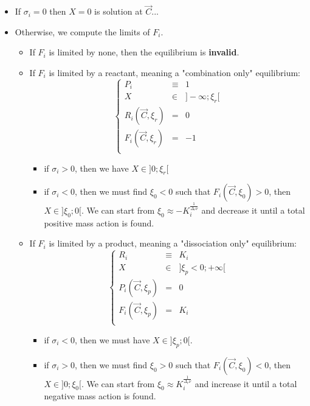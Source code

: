 \documentclass[aps,12pt]{revtex4}
\begin{document}
\begin{itemize}

\item If $\sigma_i=0$ then $X=0$ is solution at $\vec{C}$...

\item Otherwise, we compute the limits of $F_i$.
	
	\begin{itemize}
	\item If $F_i$ is limited by none, then the equilibrium is \textbf{invalid}.

	\item If $F_i$ is limited by a reactant, meaning a "combination only" equilibrium:
		\begin{equation}
		\left\lbrace
			\begin{array}{rcl}
			P_i   & \equiv & 1\\
			X     & \in & \rbrack-\infty;\xi_r\lbrack\\
			R_i(\vec{C},\xi_r)  & = & 0 \\
 			F_i(\vec{C},\xi_r)  & = & -1 \\
			\end{array}
		\right.
		\end{equation}
		\begin{itemize}
			\item if $\sigma_i>0$, then we have $X\in\rbrack 0;\xi_r \lbrack$
			\item if $\sigma_i<0$, then we must find $\xi_0<0$ such that $F_i(\vec{C},\xi_0)>0$,
			then $X\in\rbrack \xi_0;0\lbrack$.
			We can start from $\xi_0 \approx -  K_i^{\frac{1}{\Delta_r \nu}}$ and decrease it until a total positive mass action is found.
		\end{itemize}
		
 	\item If $F_i$ is limited by a product, meaning a "dissociation only" equilibrium:
	\begin{equation}
		\left\lbrace
			\begin{array}{rcl}
			R_i   & \equiv & K_i\\
			X     & \in & \rbrack \xi_p<0 ; +\infty \lbrack\\
			P_i(\vec{C},\xi_p)  & = & 0 \\
 			F_i(\vec{C},\xi_p)  & = & K_i \\
			\end{array}
		\right.
		\end{equation}

	
    	\begin{itemize}
    	\item if $\sigma_i<0$, then we must have $X\in\rbrack \xi_p;0\lbrack$.
    	\item if $\sigma_i>0$, then we must find $\xi_0>0$ such that $F_i(\vec{C},\xi_0)<0$,
    		then $X\in\rbrack 0; \xi_0 \lbrack$.
    		We can start from $\xi_0 \approx K_i^{\frac{1}{\Delta_r \nu}}$ and increase it until a total negative mass action is found.
    	\end{itemize}


\end{itemize}
\end{itemize}
\end{document}
